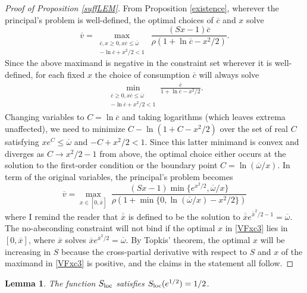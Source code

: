 \documentclass[11pt]{article}
\theoremstyle{plain}
\newtheorem{lemma}[thm]{Lemma}
\theoremstyle{definition} %
\begin{document}
\begin{proof}[Proof of Proposition \ref{suffLEM}]
From Proposition \ref{existence}, wherever the principal's problem is well-defined, the optimal choices of $\overline{c}$ and $x$ solve
\begin{equation}
\overline{v} = \max_{\substack{\overline{c},x\geq 0, x\overline{c} \leq \overline{\omega} \\ -\ln \overline{c} + x^2/2<1}} \ \frac{(Sx - 1)\overline{c}}{\rho(1 + \ln \overline{c} - x^2/2)}.
\label{VFxc2}
\end{equation}
Since the above maximand is negative in the constraint set wherever it is well-defined, for each fixed $x$ the choice of consumption $\overline{c}$ will always solve
\begin{align*}
\min_{\substack{\overline{c} \geq 0, x\overline{c} \leq \overline{\omega} \\ -\ln \overline{c} + x^2/2<1}} \frac{\overline{c}}{1 + \ln \overline{c} - x^2/2}.
\end{align*}
Changing variables to $C = \ln \overline{c}$ and taking logarithms (which leaves extrema unaffected), we need to minimize $C - \ln(1 + C - x^2/2)$ over the set of real $C$ satisfying $xe^C \leq \overline{\omega}$ and $-C + x^2/2<1$. Since this latter minimand is convex and diverges as $C \rightarrow x^2/2-1$ from above, the optimal choice either occurs at the solution to the first-order condition or the boundary point $C = \ln(\overline{\omega}/x)$. In term of the original variables, the principal's problem becomes
\begin{equation}
\overline{v} = \max_{x \in [0, \overline{\overline{x}}]} \ \frac{(Sx - 1)\min\{e^{x^2/2},\overline{\omega}/x\}}{\rho(1 + \min\{0,\ln (\overline{\omega}/x) - x^2/2\})}
\label{VFxc3}
\end{equation}
where I remind the reader that $\overline{\overline{x}}$ is defined to be the solution to $\overline{\overline{x}}e^{\overline{\overline{x}}^2/2-1} = \overline{\omega}$. The no-absconding constraint will not bind if the optimal $x$ in \eqref{VFxc3} lies in $[0, \overline{x}]$, where $\overline{x}$ solves $\overline{x}e^{\overline{x}^2/2} = \overline{\omega}$. By Topkis' theorem, the optimal $x$ will be increasing in $S$ because the cross-partial derivative with respect to $S$ and $x$ of the maximand in \eqref{VFxc3} is positive, and the claims in the statement all follow. 
\end{proof}

\begin{lemma} \label{upper}
The function $S_{\textnormal{loc}}$ satisfies $S_{\textnormal{loc}}(e^{1/2}) = 1/2$.
\end{lemma}
\end{document}
